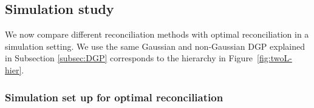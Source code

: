 \documentclass[12pt]{article}
\def\E{\text{E}}
\theoremstyle{definition}
\begin{document}
%

\subsection{Simulation study}\label{sec:Bootsrap-sim}

We now compare different reconciliation methods with optimal reconciliation in a simulation setting. We use the same Gaussian and non-Gaussian DGP explained in Subsection \ref{subsec:DGP} corresponds to the hierarchy in Figure~\ref{fig:twoL-hier}.  



\subsubsection{Simulation set up for optimal reconciliation}
\end{document}
